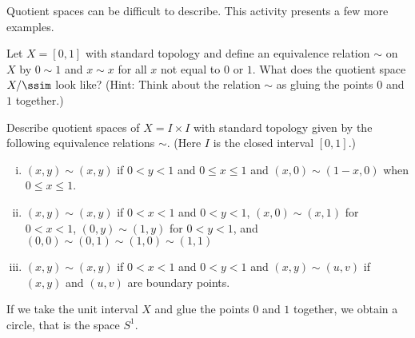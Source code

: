 \begin{activity} Quotient spaces can be difficult to describe. This activity presents a few more examples. 
\ba
\item Let $X = [0, 1]$ with standard topology and define an equivalence relation $\sim$ on $X$ by $0 \sim 1$ and $x \sim x$ for all $x$ not equal to $0$ or $1$. What does the quotient space $X/\ssim$ look like? (Hint: Think about the relation $\sim$ as gluing the points $0$ and $1$ together.)

\item Describe quotient spaces of $X = I \times I$ with standard topology given by the following equivalence relations $\sim$. (Here $I$ is the closed interval $[0,1]$.)
	\begin{enumerate}[i.]
	\item $(x, y) \sim (x,y)$ if $0 < y < 1$ and $0 \leq x \leq 1$ and $(x,0) \sim (1-x,0)$ when $0 \leq x \leq 1$. 
	
	\item $(x, y) \sim (x,y)$ if $0 < x < 1$ and $0 < y < 1$, $(x,0) \sim (x,1)$ for $0 < x < 1$, $(0,y) \sim (1,y)$ for $0 < y < 1$, and $(0,0) \sim (0,1) \sim (1,0) \sim(1,1)$
	
	\item  $(x, y) \sim (x,y)$ if $0 < x < 1$ and $0 < y < 1$ and $(x,y) \sim (u,v)$ if $(x,y)$ and $(u,v)$ are boundary points.
	
	\end{enumerate}
	
\ea

\end{activity}


\ActivitySolution

\ba
\item If we take the unit interval $X$ and glue the points $0$ and $1$ together, we obtain a circle, that is the space $S^1$. 

